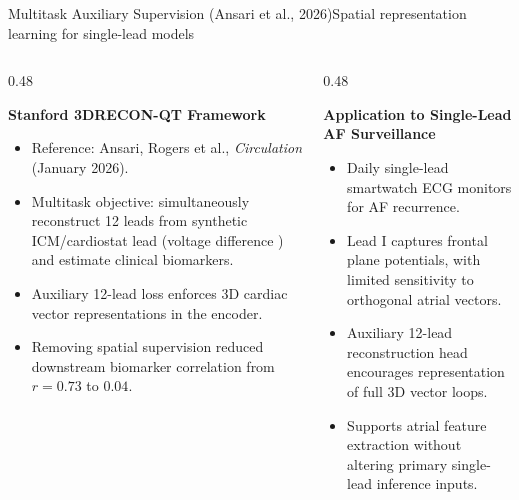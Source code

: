 \documentclass[aspectratio=169,10pt]{beamer}
\begin{document}
\begin{frame}{Multitask Auxiliary Supervision (Ansari et al., 2026)}{Spatial representation learning for single-lead models}
\begin{columns}[T]
  \begin{column}{0.48\textwidth}
    \begin{block}{\textbf{Stanford 3DRECON-QT Framework}}
      \scriptsize
      \begin{itemize}
        \setlength{\itemsep}{0.2em}
        \item Reference: Ansari, Rogers et al., \textit{Circulation} (January 2026).
        \item Multitask objective: simultaneously reconstruct 12 leads from synthetic ICM/cardiostat lead (voltage difference ) and estimate clinical biomarkers.
        \item Auxiliary 12-lead loss enforces 3D cardiac vector representations in the encoder.
        \item Removing spatial supervision reduced downstream biomarker correlation from $r = 0.73$ to $0.04$.
      \end{itemize}
    \end{block}
  \end{column}
  \begin{column}{0.48\textwidth}
    \begin{block}{\textbf{Application to Single-Lead AF Surveillance}}
      \scriptsize
      \begin{itemize}
        \setlength{\itemsep}{0.2em}
        \item Daily single-lead smartwatch ECG monitors for AF recurrence.
        \item Lead I captures frontal plane potentials, with limited sensitivity to orthogonal atrial vectors.
        \item Auxiliary 12-lead reconstruction head encourages representation of full 3D vector loops.
        \item Supports atrial feature extraction without altering primary single-lead inference inputs.
      \end{itemize}
    \end{block}
  \end{column}
\end{columns}

\end{frame}
\end{document}
